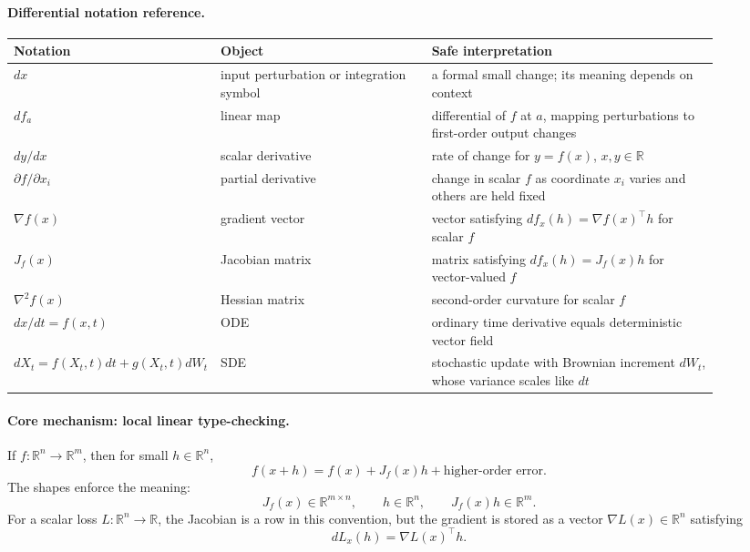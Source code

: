 \paragraph{Differential notation reference.}
\begin{center}
\small
\setlength{\tabcolsep}{2pt}
\renewcommand{\arraystretch}{1.16}
\begin{tabular}{p{0.17\linewidth}p{0.31\linewidth}p{0.42\linewidth}}
\toprule
Notation & Object & Safe interpretation \\
\midrule
\(dx\) & input perturbation or integration symbol & a formal small change; its meaning depends on context \\
\(df_a\) & linear map & differential of \(f\) at \(a\), mapping perturbations to first-order output changes \\
\(dy/dx\) & scalar derivative & rate of change for \(y=f(x)\), \(x,y\in\mathbb R\) \\
\(\partial f/\partial x_i\) & partial derivative & change in scalar \(f\) as coordinate \(x_i\) varies and others are held fixed \\
\(\nabla f(x)\) & gradient vector & vector satisfying \(df_x(h)=\nabla f(x)^\top h\) for scalar \(f\) \\
\(J_f(x)\) & Jacobian matrix & matrix satisfying \(df_x(h)=J_f(x)h\) for vector-valued \(f\) \\
\(\nabla^2 f(x)\) & Hessian matrix & second-order curvature for scalar \(f\) \\
\(dx/dt=f(x,t)\) & ODE & ordinary time derivative equals deterministic vector field \\
\(dX_t=f(X_t,t)dt+g(X_t,t)dW_t\) & SDE & stochastic update with Brownian increment \(dW_t\), whose variance scales like \(dt\) \\
\bottomrule
\end{tabular}
\end{center}

\paragraph{Core mechanism: local linear type-checking.}
If \(f:\mathbb R^n\to\mathbb R^m\), then for small \(h\in\mathbb R^n\),
\[
f(x+h)=f(x)+J_f(x)h+\text{higher-order error}.
\]
The shapes enforce the meaning:
\[
J_f(x)\in\mathbb R^{m\times n},\qquad h\in\mathbb R^n,\qquad J_f(x)h\in\mathbb R^m.
\]
For a scalar loss \(L:\mathbb R^n\to\mathbb R\), the Jacobian is a row in this convention, but the gradient is stored as a vector \(\nabla L(x)\in\mathbb R^n\) satisfying
\[
dL_x(h)=\nabla L(x)^\top h.
\]

